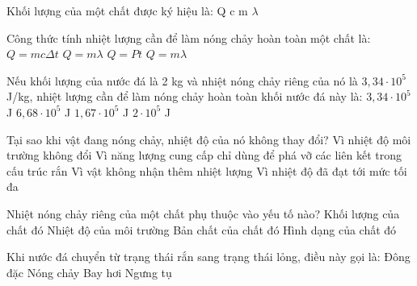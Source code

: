 \begin{ex}
Khối lượng của một chất được ký hiệu là:
\choice
{Q}
{c}
{\True m}
{$\lambda$}
\end{ex}

\begin{ex}
Công thức tính nhiệt lượng cần để làm nóng chảy hoàn toàn một chất là:
\choice
{$Q=mc\Delta t$}
{\True $Q=m\lambda$}
{$Q=Pt$}
{$Q=m\lambda$}
\end{ex}

\begin{ex}
Nếu khối lượng của nước đá là 2 kg và nhiệt nóng chảy riêng của nó là $3,34 \cdot 10^5$ J/kg, nhiệt lượng cần để làm nóng chảy hoàn toàn khối nước đá này là:
\choice
{$3,34 \cdot 10^5$ J}
{\True $6,68 \cdot 10^5$ J}
{$1,67 \cdot 10^5$ J}
{$2 \cdot 10^5$ J}
\end{ex}

\begin{ex}
Tại sao khi vật đang nóng chảy, nhiệt độ của nó không thay đổi?
\choice
{Vì nhiệt độ môi trường không đổi}
{\True Vì năng lượng cung cấp chỉ dùng để phá vỡ các liên kết trong cấu trúc rắn}
{Vì vật không nhận thêm nhiệt lượng}
{Vì nhiệt độ đã đạt tới mức tối đa}
\end{ex}

\begin{ex}
Nhiệt nóng chảy riêng của một chất phụ thuộc vào yếu tố nào?
\choice
{Khối lượng của chất đó}
{Nhiệt độ của môi trường}
{\True Bản chất của chất đó}
{Hình dạng của chất đó}
\end{ex}

\begin{ex}
Khi nước đá chuyển từ trạng thái rắn sang trạng thái lỏng, điều này gọi là:
\choice
{Đông đặc}
{\True Nóng chảy}
{Bay hơi}
{Ngưng tụ}
\end{ex}

